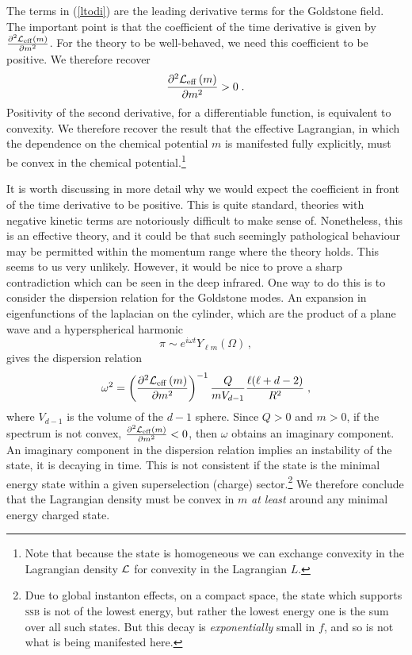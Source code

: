 \documentclass[11pt]{article}
\numberwithin{equation}{section}
\newcommand{\be}{\begin{equation}} \newcommand{\ee}{\end{equation}}
\begin{document}
The terms in (\ref{ltodi}) are the leading derivative terms for the Goldstone field. The important point is that the coefficient of the time derivative is given by $\frac{\partial^2 {\cal L}_{\mathrm{eff}}\left(m\right)}{\partial m^2}$. For the theory to be well-behaved, we need this coefficient to be positive. We therefore recover
\be
\frac{\partial^2 {\cal L}_{\mathrm{eff}}\left(m\right)}{\partial m^2} > 0 \;.
\label{convexlagm}
\ee
Positivity of the second derivative, for a differentiable function, is equivalent to convexity. We therefore recover the result that the effective Lagrangian, in which the dependence on the chemical potential $m$ is manifested fully explicitly, must be convex in the chemical potential.\footnote{Note that because the state is homogeneous we can exchange convexity in the Lagrangian density ${\cal L}$ for convexity in the Lagrangian $L$.}

It is worth discussing in more detail why we would expect the coefficient in front of the time derivative to be positive. This is quite standard, theories with negative kinetic terms are notoriously difficult to make sense of. Nonetheless, this is an effective theory, and it could be that such seemingly pathological behaviour may be permitted within the momentum range where the theory holds. This seems to us very unlikely. However, it would be nice to prove a sharp contradiction which can be seen in the deep infrared. One way to do this is to consider the dispersion relation for the Goldstone modes. An expansion in eigenfunctions of the laplacian on the cylinder, which are the product of a plane wave and a hyperspherical harmonic
\begin{equation}
  \pi \sim e^{i \omega t} Y_{\ell m}(\Omega) \, ,  
\end{equation}
gives the dispersion relation
\be
\omega^2 = \left(\frac{\partial^2{\cal L}_{\mathrm{eff}}\left(m\right)}{\partial m^2}\right)^{-1} \frac{Q}{m V_{d-1}} \frac{\ell (\ell + d - 2)}{R^2}\; ,
\ee
where $V_{d-1}$ is the volume of the \(d-1\) sphere.
Since $Q>0$ and $m>0$, if the spectrum is not convex, $\frac{\partial^2{\cal L}_{\mathrm{eff}}\left(m\right)}{\partial m^2} < 0$, then $\omega$ obtains an imaginary component. An imaginary component in the dispersion relation implies an instability of the state, it is decaying in time. This is not consistent if the state is the minimal energy state within a given superselection (charge) sector.\footnote{Due to global instanton effects, on a compact space, the state which supports \textsc{ssb} is not of the lowest energy, but rather the lowest energy one is the sum over all such states. But this decay is {\it exponentially} small in $f$, and so is not what is being manifested here.} We therefore conclude that the Lagrangian density must be convex in $m$ {\it at least} around any minimal energy charged state. 
\end{document}
